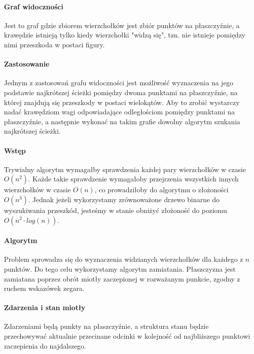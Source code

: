 \documentclass[12pt]{article}
\begin{document}
		\paragraph{Graf widoczności}
			Jest to graf gdzie zbiorem wierzchołków jest zbiór punktów na płaszczyźnie, a krawędzie istnieją tylko kiedy wierzchołki "widzą się", tzn. nie istnieje pomiędzy nimi przeszkoda w postaci figury.
		
		\paragraph{Zastosowanie}
			Jednym z zastosowań grafu widoczności jest możliwość wyznaczenia na jego podstawie najkrótszej ścieżki pomiędzy dwoma punktami na płaszczyźnie, na której znajdują się przeszkody w postaci wielokątów. Aby to zrobić wystarczy nadać krawędziom wagi odpowiadające odległościom pomiędzy punktami na płaszczyźnie, a następnie wykonać na takim grafie dowolny algorytm szukania najkrótszej ścieżki.
		
		\paragraph{Wstęp}
			Trywialny algorytm wymagałby sprawdzenia każdej pary wierzchołków w czasie $ O(n^2) $. Każde takie sprawdzenie wymagałoby przejrzenia wszystkich innych wierzchołków w czasie $ O(n) $, co prowadziłoby do algorytmu o złożoności $ O(n^3) $. Jednak jeżeli wykorzystamy zrównoważone drzewo binarne do wyszukiwania przeszkód, jesteśmy w stanie obniżyć złożoność do poziomu $ O(n^2 \cdot log(n)) $.
		
		\paragraph{Algorytm}
			Problem sprowadza się do wyznaczenia widzianych wierzchołków dla każdego z $ n $ punktów. Do tego celu wykorzystamy algorytm zamiatania. Płaszczyzna jest zamiatana poprzez obrót miotły zaczepionej w rozważanym punkcie, zgodny z ruchem wskazówek zegara.
			
		\paragraph{Zdarzenia i stan miotły}
		Zdarzeniami będą punkty na płaszczyźnie, a struktura stanu będzie przechowywać aktualnie przecinane odcinki w kolejność od najbliższego punktowi zaczepienia do najdalszego.
	
\end{document}

